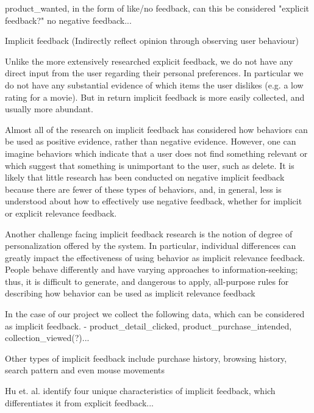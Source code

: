 product\_wanted, in the form of like/no feedback, can this be considered "explicit feedback?" no negative feedback...

Implicit feedback (Indirectly reflect opinion through observing user behaviour)

Unlike the more extensively researched explicit feedback, we do not have any
direct input from the user regarding their personal preferences. In particular
we do not have any substantial evidence of which items the user dislikes (e.g. a
low rating for a movie). But in return implicit feedback is more easily
collected, and usually more abundant.

Almost all of the research on implicit feedback has considered how behaviors can
be used as positive evidence, rather than negative evidence. However, one can imagine
behaviors which indicate that a user does not find something relevant or which suggest
that something is unimportant to the user, such as delete. It is likely that little research
has been conducted on negative implicit feedback because there are fewer of these types
of behaviors, and, in general, less is understood about how to effectively use negative
feedback, whether for implicit or explicit relevance feedback.

Another challenge facing implicit feedback research is the notion of degree of
personalization offered by the system. In particular, individual differences can greatly
impact the effectiveness of using behavior as implicit relevance feedback. People behave
differently and have varying approaches to information-seeking; thus, it is difficult to
generate, and dangerous to apply, all-purpose rules for describing how behavior can be
used as implicit relevance feedback


In the case of our project we collect the following data, which can be considered as implicit feedback.
- product\_detail\_clicked, product\_purchase\_intended, collection\_viewed(?)...

Other types of implicit feedback include purchase history, browsing
history, search pattern and even mouse movements

Hu et. al. \cite{Hu2008} identify four unique characteristics of implicit feedback, which differentiates it from explicit feedback...

